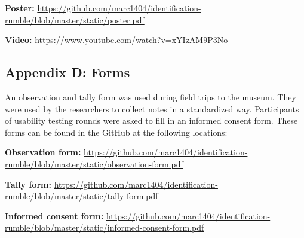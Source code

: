 \begin{flushleft}
  \textbf{Poster:} \break
  \url{https://github.com/marc1404/identification-rumble/blob/master/static/poster.pdf}
\end{flushleft}

\begin{flushleft}
  \textbf{Video:} \break
  \url{https://www.youtube.com/watch?v=xYIzAM9P3No}
\end{flushleft}


\subsection*{Appendix D: Forms}
An observation and tally form was used during field trips to the museum.
They were used by the researchers to collect notes in a standardized way.
Participants of usability testing rounds were asked to fill in an informed consent form.
These forms can be found in the GitHub at the following locations:

\begin{flushleft}
  \textbf{Observation form:} \break
  \url{https://github.com/marc1404/identification-rumble/blob/master/static/observation-form.pdf}
\end{flushleft}

\begin{flushleft}
  \textbf{Tally form:} \break
  \url{https://github.com/marc1404/identification-rumble/blob/master/static/tally-form.pdf}
\end{flushleft}

\begin{flushleft}
  \textbf{Informed consent form:} \break
  \url{https://github.com/marc1404/identification-rumble/blob/master/static/informed-consent-form.pdf}
\end{flushleft}
